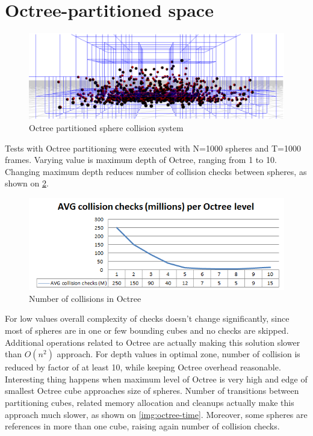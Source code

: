 \section{Octree-partitioned space}
\label{sec:sphereoctree}

\begin{figure}[h!]
  \caption{Octree partitioned sphere collision system}
  \label{img:spheres}
  \centering
	\includegraphics[width=16cm]{spheres/render2.png}
\end{figure}

Tests with Octree partitioning were executed with N=1000 spheres and T=1000 frames. Varying value is maximum depth of Octree, ranging from 1 to 10. 
Changing maximum depth reduces number of collision checks between spheres, as shown on \ref{img:octree-collisions}.

\begin{figure}[h!]
  \caption{Number of collisions in Octree}
  \label{img:octree-collisions}
  \centering
	\includegraphics[width=16cm]{spheres/octree-collisions.png}
\end{figure}

For low values overall complexity of checks doesn't change significantly, since most of spheres are in one or few bounding cubes and no checks are skipped. Additional operations related to Octree are actually making this solution slower than $O(n^2)$ approach. For depth values in optimal zone, number of collision is reduced by factor of at least 10, while keeping Octree overhead reasonable. Interesting thing happens when maximum level of Octree is very high and edge of smallest Octree cube approaches size of spheres. Number of transitions between partitioning cubes, related memory allocation and cleanups actually make this approach much slower, as shown on \ref{img:octree-time}. Moreover, some spheres are references in more than one cube, raising again number of collision checks.

